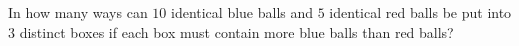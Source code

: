 In how many ways can $10$ identical blue balls and $5$ identical red balls be put into $3$ distinct boxes if each box must contain more blue balls than red balls?
